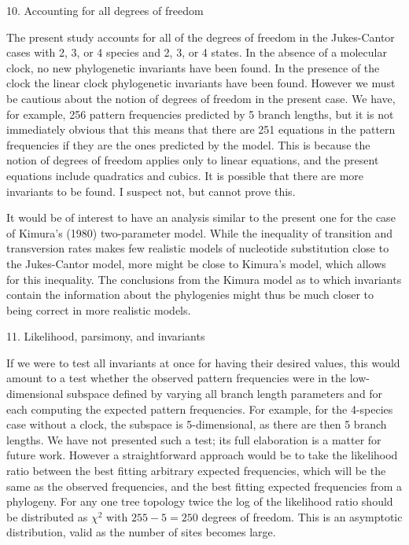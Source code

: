 \bigskip
\centerline{10. Accounting for all degrees of freedom}
\medskip

The present study accounts for all of the degrees of freedom in the
Jukes-Cantor cases with 2, 3, or 4 species and 2, 3, or 4 states.  In the
absence of a molecular clock, no new phylogenetic invariants have been found.
In the presence of the clock the linear clock phylogenetic invariants have
been found.  However we must be cautious about the notion of degrees of
freedom in the present case.  We have, for example, 256 pattern frequencies
predicted by 5 branch lengths, but it is not immediately obvious that this
means that there are 251 equations in the pattern frequencies if they are
the ones predicted by the model.  This is because the notion of degrees of
freedom applies only to linear equations, and the present equations include
quadratics and cubics.  It is possible that there are more invariants to be
found.  I suspect not, but cannot prove this.
 
It would be of interest to have an analysis similar to the present one for
the case of Kimura's (1980) two-parameter model.  While the inequality of
transition and transversion rates makes few realistic models of nucleotide
substitution close to the Jukes-Cantor model, more might be close to Kimura's
model, which allows for this inequality.  The conclusions from the Kimura
model as to which 
invariants contain the information about the phylogenies might thus be much 
closer to being correct in more realistic models.
\bigskip

\centerline{11. Likelihood, parsimony, and invariants}
\medskip

If we were to test all invariants at once for having their desired values,
this would amount to a test whether the observed pattern frequencies were in
the low-dimensional subspace defined by varying all branch length parameters
and for each computing the expected pattern frequencies.  For example, for
the 4-species case without a clock, the subspace is 5-dimensional, as
there are then 5 branch lengths.  We have not presented such a test; its
full elaboration is a matter for future work.  However a straightforward
approach would be to take the likelihood ratio between the best fitting
arbitrary expected frequencies, which will be the same as the observed
frequencies, and the best fitting expected frequencies from a phylogeny.
For any one tree topology twice the log of the likelihood ratio should be
distributed as $\chi^2$ with $255 - 5 = 250$ degrees of freedom.  This is an
asymptotic distribution, valid as the number of sites becomes large.


